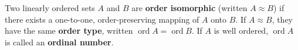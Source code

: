 Two linearly ordered sets \(A\) and \(B\) are \textbf{order isomorphic} (written \(A \approx B\)) if there exists a one-to-one, order-preserving mapping of \(A\) onto \(B\). If \(A \approx B\), they have the same \textbf{order type}, written \(\operatorname{ord} A = \operatorname{ord} B\). If \(A\) is well ordered, \(\operatorname{ord} A\) is called an \textbf{ordinal number}.
